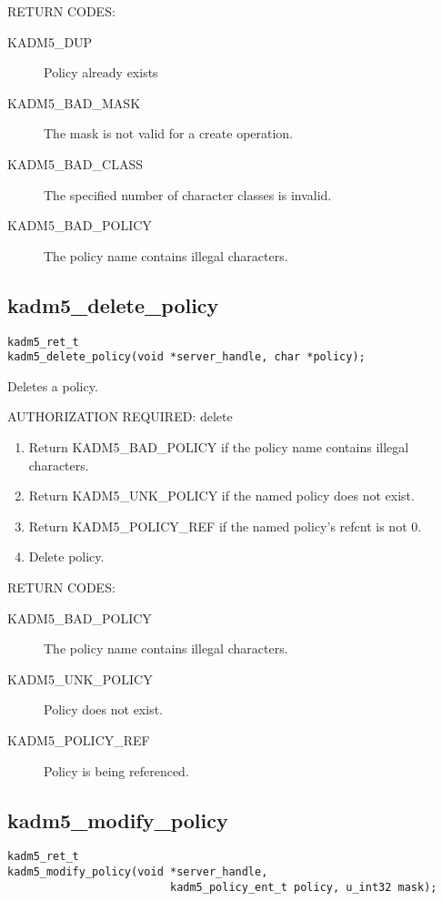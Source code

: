 RETURN CODES:

\begin{description}
\item[KADM5_DUP] Policy already exists
\item[KADM5_BAD_MASK] The mask is not valid for a create
operation.
\item[KADM5_BAD_CLASS] The specified number of character classes
is invalid.
\item[KADM5_BAD_POLICY] The policy name contains illegal characters.
\end{description}

\subsection{kadm5_delete_policy}

\begin{verbatim}
kadm5_ret_t
kadm5_delete_policy(void *server_handle, char *policy);
\end{verbatim}

Deletes a policy.

AUTHORIZATION REQUIRED: delete

\begin{enumerate}
\item Return KADM5_BAD_POLICY if the policy name contains illegal
characters.
\item Return KADM5_UNK_POLICY if the named policy does not exist.
\item Return KADM5_POLICY_REF if the named policy's refcnt is not 0.
\item Delete policy.
\end{enumerate}

RETURN CODES:

\begin{description}
\item[KADM5_BAD_POLICY] The policy name contains illegal characters.
\item[KADM5_UNK_POLICY] Policy does not exist.
\item[KADM5_POLICY_REF] Policy is being referenced. 
\end{description}

\subsection{kadm5_modify_policy}

\begin{verbatim}
kadm5_ret_t
kadm5_modify_policy(void *server_handle,
                         kadm5_policy_ent_t policy, u_int32 mask);
\end{verbatim}

